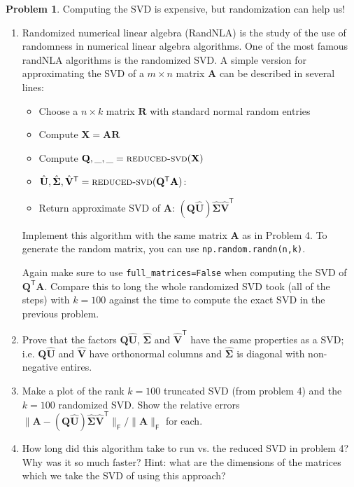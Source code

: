 \documentclass[12pt]{article}
\theoremstyle{definition}
\newtheorem{problem}{Problem}
\renewcommand{\vec}{\mathbf}
\newcommand{\T}{\mathsf{T}}
\newcommand{\F}{\mathsf{F}}
\begin{document}
\vspace{2em}
\begin{problem}
    Computing the SVD is expensive, but randomization can help us!
    \begin{enumerate}
        \item Randomized numerical linear algebra (RandNLA) is the study of the use of randomness in numerical linear algebra algorithms. 
            One of the most famous randNLA algorithms is the randomized SVD.
            A simple version for approximating the SVD of a $m\times n$ matrix $\vec{A}$ can be described in several lines:
            \begin{itemize}
                \item Choose a $n\times k$ matrix $\vec{R}$ with standard normal random entries
                \item Compute $\vec{X} = \vec{A} \vec{R}$
                \item Compute $\vec{Q},\_,\_ = \textsc{reduced-svd}(\vec{X})$
                \item 
                    $\hat{\vec{U}}, \hat{\vec{\Sigma}}, \hat{\vec{V}}^\T = \textsc{reduced-svd}(\vec{Q}^\T \vec{A})$: 
                \item Return approximate SVD of $\vec{A}$: $(\vec{Q} \hat{\vec{U}}) \hat{\vec{\Sigma}} \hat{\vec{V}}^\T$  
            \end{itemize}

            Implement this algorithm with the same matrix $\vec{A}$ as in Problem 4.
            To generate the random matrix, you can use \lstinline{np.random.randn(n,k)}.


            Again make sure to use \lstinline{full_matrices=False} when computing the SVD of $\vec{Q}^\T \vec{A}$.
            Compare this to long the whole randomized SVD took (all of the steps) with $k=100$ against the time to compute the exact SVD in the previous problem.
       
        \item Prove that the factors $\vec{Q}\hat{\vec{U}}$, $\hat{\vec{\Sigma}}$ and $\hat{\vec{V}}^\T$ have the same properties as a SVD; i.e. $\vec{Q}\hat{\vec{U}}$ and $\hat{\vec{V}}$ have orthonormal columns and $\hat{\vec{\Sigma}}$ is diagonal with non-negative entires.
        \item 
            Make a plot of the rank $k=100$ truncated SVD (from problem 4) and the $k=100$ randomized SVD.
            Show the relative errors $\|\vec{A} - (\vec{Q} \hat{\vec{U}})\hat{\vec{\Sigma}} \hat{\vec{V}}^\T \|_\F/\|\vec{A}\|_\F$ for each. 
        \item How long did this algorithm take to run vs. the reduced SVD in problem 4? Why was it so much faster? Hint: what are the dimensions of the matrices which we take the SVD of using this approach?

    \end{enumerate}
\end{problem}
\end{document}
